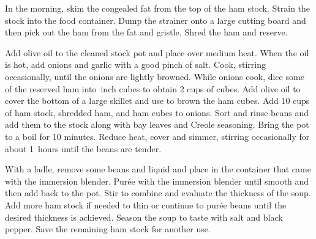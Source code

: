 \documentclass[letterpaper]{recipePMG}
\newcommand{\quarter}{\nicefrac{1}{4} \,}
\newcommand{\half}{\nicefrac{1}{2} \,}
\begin{document}
In the morning, skim the congealed fat from the top of the ham stock. Strain the stock into the food container.  Dump the strainer onto a large cutting board and then pick out the ham from the fat and gristle. Shred the ham and reserve.  

Add olive oil to the cleaned stock pot and place over medium heat.  When the oil is hot, add onions and garlic with a good pinch of salt. Cook, stirring occasionally, until the onions are lightly browned. While onions cook, dice some of the reserved ham into \quarter inch cubes to obtain 2 cups of cubes.  Add olive oil to cover the bottom of a large skillet and use to brown the ham cubes. Add 10 cups of ham stock, shredded ham, and ham cubes to onions. Sort and rinse beans and add them to the stock along with bay leaves and Creole seasoning. Bring the pot to a boil for 10 minutes. Reduce heat, cover and simmer, stirring occasionally for about 1\half hours until the beans are tender. 

With a ladle, remove some beans and liquid and place in the container that came with the immersion blender.  Pur\'{e}e with the immersion blender until smooth and then add back to the pot. Stir to combine and evaluate the thickness of the soup. Add more ham stock if needed to thin or continue to pur\'{e}e beans until the desired thickness is achieved. Season the soup to taste with salt and black pepper. Save the remaining ham stock for another use.

\newpage
\end{document}
